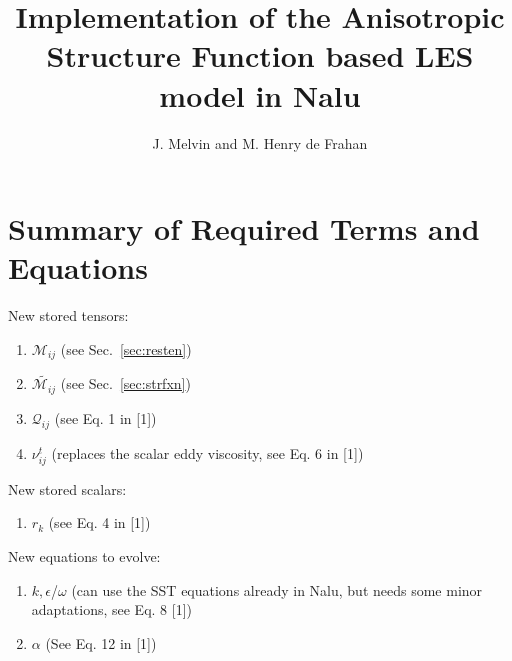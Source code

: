 \documentclass[12pt]{article}
\title{Implementation of the Anisotropic Structure Function based LES model in Nalu}
\author{J. Melvin and M. Henry de Frahan}
\begin{document}
\maketitle

\section{Summary of Required Terms and Equations}

\noindent New stored tensors:
\begin{enumerate}
\item $\mathcal{M}_{ij}$ (see Sec.~\ref{sec:resten})
\item $\tilde{\mathcal{M}_{ij}}$ (see Sec.~\ref{sec:strfxn})
\item $\mathcal{Q}_{ij}$ (see Eq. 1 in [1])
\item $\nu_{ij}^t$ (replaces the scalar eddy viscosity, see Eq. 6 in [1]) 
\end{enumerate}

\noindent New stored scalars: 
\begin{enumerate}
\item $r_k$ (see Eq. 4 in [1])
\end{enumerate}

\noindent New equations to evolve:
\begin{enumerate}
\item $k, \epsilon$/$\omega$ (can use the SST equations already in Nalu, but needs some minor adaptations, see Eq. 8 [1]) 
\item $\alpha$ (See Eq. 12 in [1])
\end{enumerate}
\end{document}
